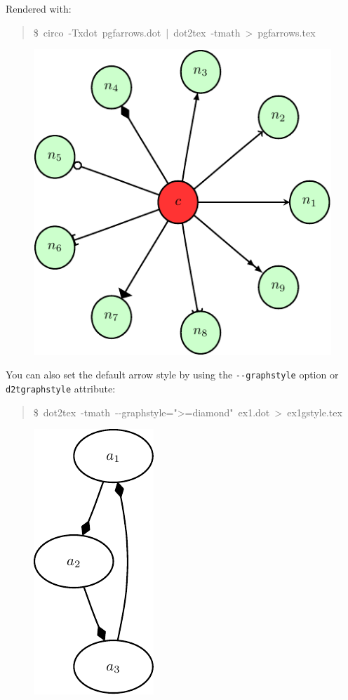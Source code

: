 \documentclass[10pt,a4paper,english]{article}
\begin{document}
Rendered with:
\begin{quote}{\ttfamily \raggedright \noindent
{\$}~circo~-Txdot~pgfarrows.dot~|~dot2tex~-tmath~>~pgfarrows.tex
}\end{quote}
\begin{figure}[H]
\centering

\includegraphics{pdf/pgfarrows}
\end{figure}

You can also set the default arrow style by using the \texttt{-{}-graphstyle} option or \texttt{d2tgraphstyle} attribute:
\begin{quote}{\ttfamily \raggedright \noindent
{\$}~dot2tex~-tmath~-{}-graphstyle=">=diamond"~ex1.dot~>~ex1gstyle.tex
}\end{quote}
\begin{figure}[H]
\centering

\includegraphics{pdf/ex1gstyle}
\end{figure}
\end{document}
